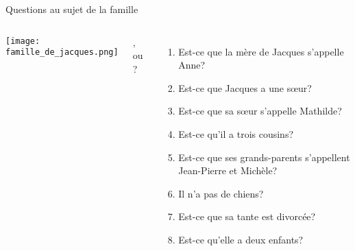 \begin{frame}{Questions au sujet de la famille}
  \begin{columns}[T]
      \texttt{[image: famille\_de\_jacques.png]}
      {\small
        ,  ou ?
        \begin{enumerate}
          \item Est-ce que la mère de Jacques s'appelle Anne?
          \item Est-ce que Jacques a une sœur?
          \item Est-ce que sa sœur s'appelle Mathilde?
          \item Est-ce qu'il a trois cousins?
          \item Est-ce que ses grands-parents s'appellent Jean-Pierre et Michèle?
          \item Il n'a pas de chiens?
          \item Est-ce que sa tante est divorcée?
          \item Est-ce qu'elle a deux enfants?
        \end{enumerate}
      }
  \end{columns}
\end{frame}